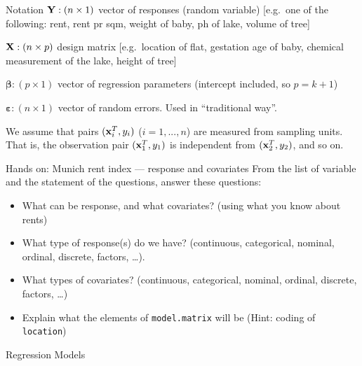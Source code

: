 \documentclass[
  ignorenonframetext,
]{beamer}
\providecommand{\tightlist}{%
  \setlength{\itemsep}{0pt}\setlength{\parskip}{0pt}}
\begin{document}
\begin{frame}{Notation}
\protect{}\label{notation}
\({\bf Y}: (n \times 1)\) vector of responses (random variable)
{[}e.g.~one of the following: rent, rent pr sqm, weight of baby, ph of
lake, volume of tree{]}

\({\bf X}: (n \times p)\) design matrix {[}e.g.~location of flat,
gestation age of baby, chemical measurement of the lake, height of
tree{]}

\(\boldsymbol{\beta}: (p \times 1)\) vector of regression parameters
(intercept included, so \(p=k+1\))

\(\boldsymbol{\varepsilon}: (n\times 1)\) vector of random errors. Used
in ``traditional way''.

We assume that pairs \(({\bf x}_i^T,y_i)\) (\(i=1,...,n\)) are measured
from sampling units. That is, the observation pair \(({\bf x}_1^T,y_1)\)
is independent from \(({\bf x}_2^T,y_2)\), and so on.
\end{frame}

\begin{frame}[fragile]
\begin{block}{Hands on: Munich rent index --- response and covariates}
\protect{}\label{hands-on-munich-rent-index-response-and-covariates}
From the list of variable and the statement of the questions, answer
these questions:

\begin{itemize}
\tightlist
\item
  {What can be response, and what covariates? (using what you know about
  rents)}
\item
  {What type of response(s) do we have? (continuous, categorical,
  nominal, ordinal, discrete, factors, \ldots). }
\item
  {What types of covariates? (continuous, categorical, nominal, ordinal,
  discrete, factors, \ldots) }
\item
  {Explain what the elements of \texttt{model.matrix} will be (Hint:
  coding of \texttt{location}) }
\end{itemize}
\end{block}
\end{frame}

\begin{frame}{Regression Models}
\protect{}\label{regression-models}
\end{frame}
\end{document}
